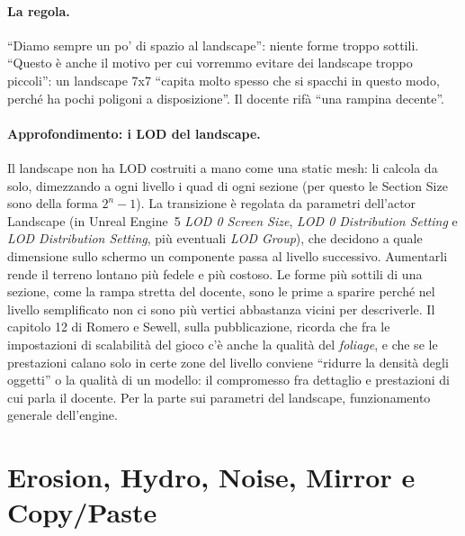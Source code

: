 \paragraph{La regola.} ``Diamo sempre un po' di spazio al landscape'': niente forme troppo
sottili. ``Questo è anche il motivo per cui vorremmo evitare dei landscape troppo piccoli'':
un landscape 7x7 ``capita molto spesso che si spacchi in questo modo, perché ha pochi
poligoni a disposizione''. Il docente rifà ``una rampina decente''.

\paragraph{Approfondimento: i LOD del landscape.} Il landscape non ha LOD costruiti a mano
come una static mesh: li calcola da solo, dimezzando a ogni livello i quad di ogni sezione
(per questo le Section Size sono della forma $2^n-1$). La transizione è regolata da
parametri dell'actor Landscape (in Unreal Engine~5 \emph{LOD 0 Screen Size}, \emph{LOD 0
Distribution Setting} e \emph{LOD Distribution Setting}, più eventuali \emph{LOD Group}),
che decidono a quale dimensione sullo schermo un componente passa al livello successivo.
Aumentarli rende il terreno lontano più fedele e più costoso. Le forme più sottili di una
sezione, come la rampa stretta del docente, sono le prime a sparire perché nel livello
semplificato non ci sono più vertici abbastanza vicini per descriverle. Il capitolo 12 di
Romero e Sewell, sulla pubblicazione, ricorda che fra le impostazioni di scalabilità del
gioco c'è anche la qualità del \emph{foliage}, e che se le prestazioni calano solo in certe
zone del livello conviene ``ridurre la densità degli oggetti'' o la qualità di un modello:
il compromesso fra dettaglio e prestazioni di cui parla il docente. Per la parte sui
parametri del landscape, funzionamento generale dell'engine.

\section{Erosion, Hydro, Noise, Mirror e Copy/Paste}
\label{ue14:sec:altristrumenti}

